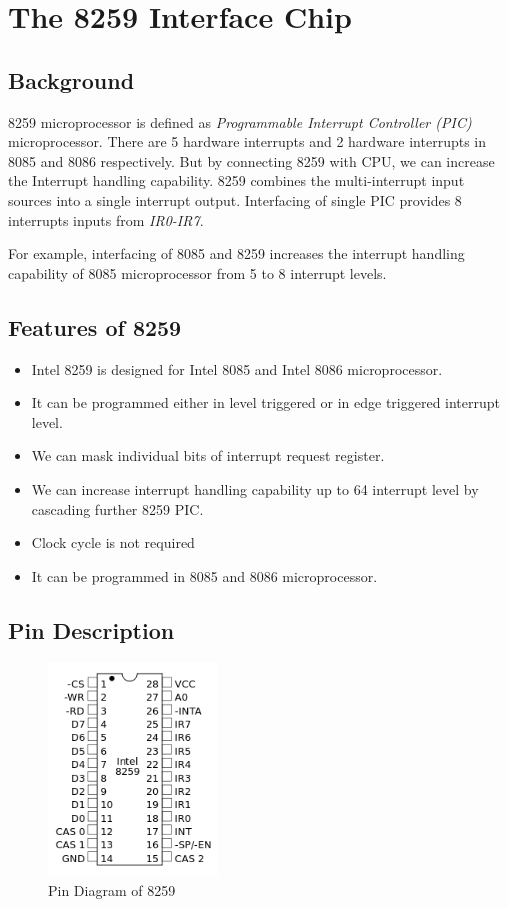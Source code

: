 \section{The 8259 Interface Chip}

\subsection{Background}

8259 microprocessor is defined as \textit{Programmable Interrupt Controller (PIC)}  microprocessor.
There are 5 hardware interrupts and 2 hardware interrupts in 8085 and 8086 respectively. But by
connecting 8259 with CPU, we can increase the Interrupt handling capability. 8259 combines the
multi-interrupt input sources into a single interrupt output. Interfacing of single PIC provides 8
interrupts inputs from \textit{IR0-IR7}.

For example, interfacing of 8085 and 8259 increases the interrupt handling capability of 8085
microprocessor from 5 to 8 interrupt levels.

\subsection{Features of 8259}

\begin{itemize}
    \item Intel 8259 is designed for Intel 8085 and Intel 8086 microprocessor.
    \item It can be programmed either in level triggered or in edge triggered interrupt level.
    \item We can mask individual bits of interrupt request register.
    \item We can increase interrupt handling capability up to 64 interrupt level by cascading
          further 8259 PIC.
    \item Clock cycle is not required
    \item It can be programmed in 8085 and 8086 microprocessor.
\end{itemize}

\subsection{Pin Description}

\begin{figure}[ht]
    \centering
    \includegraphics[width=0.4\textwidth]{res/practicals/8259pins.png}
    \caption{Pin Diagram of 8259}
    \label{fig:8259_pin}
\end{figure}

